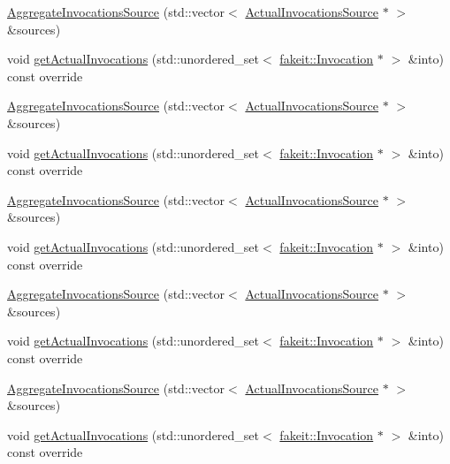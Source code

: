\begin{DoxyCompactItemize}
\item 
\mbox{\hyperlink{structfakeit_1_1AggregateInvocationsSource_a78f9370e3a080514683a15368399dd0f}{Aggregate\+Invocations\+Source}} (std\+::vector$<$ \mbox{\hyperlink{structfakeit_1_1ActualInvocationsSource}{Actual\+Invocations\+Source}} $\ast$ $>$ \&sources)
\item 
void \mbox{\hyperlink{structfakeit_1_1AggregateInvocationsSource_a46d5ec34c9428d33be90ba03fecc1f44}{get\+Actual\+Invocations}} (std\+::unordered\+\_\+set$<$ \mbox{\hyperlink{structfakeit_1_1Invocation}{fakeit\+::\+Invocation}} $\ast$ $>$ \&into) const override
\item 
\mbox{\hyperlink{structfakeit_1_1AggregateInvocationsSource_a78f9370e3a080514683a15368399dd0f}{Aggregate\+Invocations\+Source}} (std\+::vector$<$ \mbox{\hyperlink{structfakeit_1_1ActualInvocationsSource}{Actual\+Invocations\+Source}} $\ast$ $>$ \&sources)
\item 
void \mbox{\hyperlink{structfakeit_1_1AggregateInvocationsSource_a46d5ec34c9428d33be90ba03fecc1f44}{get\+Actual\+Invocations}} (std\+::unordered\+\_\+set$<$ \mbox{\hyperlink{structfakeit_1_1Invocation}{fakeit\+::\+Invocation}} $\ast$ $>$ \&into) const override
\item 
\mbox{\hyperlink{structfakeit_1_1AggregateInvocationsSource_a78f9370e3a080514683a15368399dd0f}{Aggregate\+Invocations\+Source}} (std\+::vector$<$ \mbox{\hyperlink{structfakeit_1_1ActualInvocationsSource}{Actual\+Invocations\+Source}} $\ast$ $>$ \&sources)
\item 
void \mbox{\hyperlink{structfakeit_1_1AggregateInvocationsSource_a46d5ec34c9428d33be90ba03fecc1f44}{get\+Actual\+Invocations}} (std\+::unordered\+\_\+set$<$ \mbox{\hyperlink{structfakeit_1_1Invocation}{fakeit\+::\+Invocation}} $\ast$ $>$ \&into) const override
\item 
\mbox{\hyperlink{structfakeit_1_1AggregateInvocationsSource_a78f9370e3a080514683a15368399dd0f}{Aggregate\+Invocations\+Source}} (std\+::vector$<$ \mbox{\hyperlink{structfakeit_1_1ActualInvocationsSource}{Actual\+Invocations\+Source}} $\ast$ $>$ \&sources)
\item 
void \mbox{\hyperlink{structfakeit_1_1AggregateInvocationsSource_a46d5ec34c9428d33be90ba03fecc1f44}{get\+Actual\+Invocations}} (std\+::unordered\+\_\+set$<$ \mbox{\hyperlink{structfakeit_1_1Invocation}{fakeit\+::\+Invocation}} $\ast$ $>$ \&into) const override
\item 
\mbox{\hyperlink{structfakeit_1_1AggregateInvocationsSource_a78f9370e3a080514683a15368399dd0f}{Aggregate\+Invocations\+Source}} (std\+::vector$<$ \mbox{\hyperlink{structfakeit_1_1ActualInvocationsSource}{Actual\+Invocations\+Source}} $\ast$ $>$ \&sources)
\item 
void \mbox{\hyperlink{structfakeit_1_1AggregateInvocationsSource_a46d5ec34c9428d33be90ba03fecc1f44}{get\+Actual\+Invocations}} (std\+::unordered\+\_\+set$<$ \mbox{\hyperlink{structfakeit_1_1Invocation}{fakeit\+::\+Invocation}} $\ast$ $>$ \&into) const override
\end{DoxyCompactItemize}
